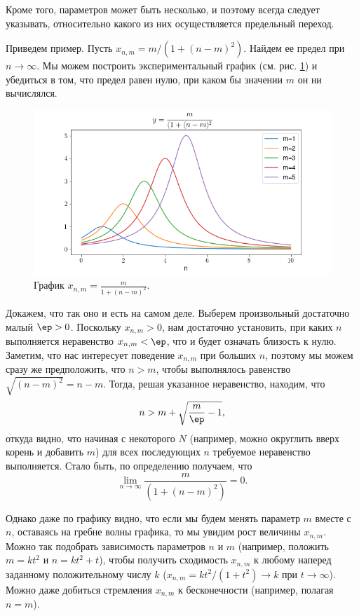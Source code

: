 \begin{enumerate}
Кроме того, параметров может быть несколько, и поэтому всегда следует указывать, относительно какого из них осуществляется предельный переход.

Приведем пример. Пусть $x_{n,m}=m/(1+(n-m)^2)$. Найдем ее предел при $n\to\infty$. Мы можем построить экспериментальный график (см. рис. \ref{LimVar}) и убедиться в том, что предел равен нулю, при каком бы значении $m$ он ни вычислялся.
\begin{figure}[hbt!]
\begin{center}
\includegraphics[scale=0.55]{limits.png}
\end{center}\caption{График $\displaystyle x_{n,m}=\frac{m}{1+(n-m)^2}$.}\label{LimVar}
\end{figure}

Докажем, что так оно и есть на самом деле. Выберем произвольный достаточно малый $\ep>0$. Поскольку $x_{n,m}>0$, нам достаточно установить, при каких $n$ выполняется неравенство $x_{n,m}<\ep$, что и будет означать близость к нулю. Заметим, что нас интересует поведение $x_{n,m}$ при больших $n$, поэтому мы можем сразу же предположить, что $n>m$, чтобы выполнялось равенство $\sqrt{(n-m)^2}=n-m$. Тогда, решая указанное неравенство, находим, что
$$
n>m+\sqrt{\frac{m}{\ep}-1},
$$
откуда видно, что начиная с некоторого $N$ (например, можно округлить вверх корень и добавить $m$) для всех последующих $n$ требуемое неравенство выполняется. Стало быть, по определению получаем, что
$$
\lim_{n\to\infty}\frac{m}{(1+(n-m)^2)}=0.
$$

Однако даже по графику видно, что если мы будем менять параметр $m$ вместе с $n$, оставаясь на гребне волны графика, то мы увидим рост величины $x_{n,m}$.
Можно так подобрать зависимость параметров $n$ и $m$ (например, положить $m=kt^2$ и $n=kt^2+t$), чтобы получить сходимость $x_{n,m}$ к любому наперед заданному положительному числу $k$ ($x_{n,m}=kt^2/(1+t^2)\to k$ при $t\to\infty$). Можно даже добиться стремления $x_{n,m}$ к бесконечности (например, полагая $n=m$).


\end{enumerate}
